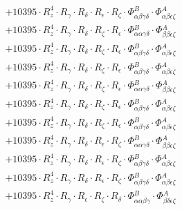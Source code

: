 \documentclass{article}
\begin{document}
\begin{subequations}
\begin{gather}
\begin{array}{c}
 \\[0.2em] 		 + 10395 \cdot R_{z}^{4} \cdot R_{\gamma{}} \cdot R_{\delta{}} \cdot R_{\epsilon{}} \cdot R_{\zeta{}} \cdot \Phi{}^{B}_{\alpha{}\beta{}\gamma{}\delta{}} \cdot \Phi{}^{A}_{\alpha{}\beta{}\epsilon{}\zeta{}} 
 \\[0.2em] 		 + 10395 \cdot R_{z}^{4} \cdot R_{\gamma{}} \cdot R_{\delta{}} \cdot R_{\zeta{}} \cdot R_{\epsilon{}} \cdot \Phi{}^{B}_{\alpha{}\alpha{}\gamma{}\delta{}} \cdot \Phi{}^{A}_{\beta{}\beta{}\epsilon{}\zeta{}} 
 \\[0.2em] 		 + 10395 \cdot R_{z}^{4} \cdot R_{\gamma{}} \cdot R_{\delta{}} \cdot R_{\zeta{}} \cdot R_{\epsilon{}} \cdot \Phi{}^{B}_{\alpha{}\beta{}\gamma{}\delta{}} \cdot \Phi{}^{A}_{\alpha{}\beta{}\epsilon{}\zeta{}} 
 \\[0.2em] 		 + 10395 \cdot R_{z}^{4} \cdot R_{\gamma{}} \cdot R_{\delta{}} \cdot R_{\zeta{}} \cdot R_{\epsilon{}} \cdot \Phi{}^{B}_{\alpha{}\beta{}\gamma{}\delta{}} \cdot \Phi{}^{A}_{\alpha{}\beta{}\epsilon{}\zeta{}} 
 \\[0.2em] 		 + 10395 \cdot R_{z}^{4} \cdot R_{\gamma{}} \cdot R_{\delta{}} \cdot R_{\zeta{}} \cdot R_{\epsilon{}} \cdot \Phi{}^{B}_{\alpha{}\alpha{}\gamma{}\delta{}} \cdot \Phi{}^{A}_{\beta{}\beta{}\epsilon{}\zeta{}} 
 \\[0.2em] 		 + 10395 \cdot R_{z}^{4} \cdot R_{\gamma{}} \cdot R_{\delta{}} \cdot R_{\zeta{}} \cdot R_{\epsilon{}} \cdot \Phi{}^{B}_{\alpha{}\beta{}\gamma{}\delta{}} \cdot \Phi{}^{A}_{\alpha{}\beta{}\epsilon{}\zeta{}} 
 \\[0.2em] 		 + 10395 \cdot R_{z}^{4} \cdot R_{\gamma{}} \cdot R_{\delta{}} \cdot R_{\zeta{}} \cdot R_{\epsilon{}} \cdot \Phi{}^{B}_{\alpha{}\beta{}\gamma{}\delta{}} \cdot \Phi{}^{A}_{\alpha{}\beta{}\epsilon{}\zeta{}} 
 \\[0.2em] 		 + 10395 \cdot R_{z}^{4} \cdot R_{\gamma{}} \cdot R_{\delta{}} \cdot R_{\epsilon{}} \cdot R_{\zeta{}} \cdot \Phi{}^{B}_{\alpha{}\alpha{}\gamma{}\delta{}} \cdot \Phi{}^{A}_{\beta{}\beta{}\epsilon{}\zeta{}} 
 \\[0.2em] 		 + 10395 \cdot R_{z}^{4} \cdot R_{\gamma{}} \cdot R_{\delta{}} \cdot R_{\epsilon{}} \cdot R_{\zeta{}} \cdot \Phi{}^{B}_{\alpha{}\beta{}\gamma{}\delta{}} \cdot \Phi{}^{A}_{\alpha{}\beta{}\epsilon{}\zeta{}} 
 \\[0.2em] 		 + 10395 \cdot R_{z}^{4} \cdot R_{\gamma{}} \cdot R_{\delta{}} \cdot R_{\epsilon{}} \cdot R_{\zeta{}} \cdot \Phi{}^{B}_{\alpha{}\beta{}\gamma{}\delta{}} \cdot \Phi{}^{A}_{\alpha{}\beta{}\epsilon{}\zeta{}} 
 \\[0.2em] 		 + 10395 \cdot R_{z}^{4} \cdot R_{\gamma{}} \cdot R_{\epsilon{}} \cdot R_{\zeta{}} \cdot R_{\delta{}} \cdot \Phi{}^{B}_{\alpha{}\alpha{}\beta{}\gamma{}} \cdot \Phi{}^{A}_{\beta{}\delta{}\epsilon{}\zeta{}} 

\end{array}
\end{gather}
\end{subequations}
\end{document}
